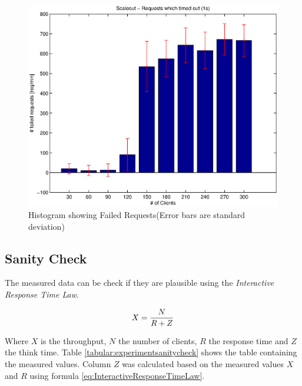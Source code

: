 \documentclass[a4paper]{article}
\begin{document}


\begin{figure}[H]
	\begin{center}
    \includegraphics[scale=0.6]{../plots-ms2-mg/experiment-err.eps}
  \end{center}
  \caption{Histogram showing Failed Requests\newline(Error bars are standard deviation)}
  \label{fig:experiment-error}
\end{figure}


\subsection{Sanity Check}

The measured data can be check if they are plausible using the \textit{Interactive Response Time Law}.

\begin{equation}
\label{eq:InteractiveResponseTimeLaw}
X = {{N} \over {R + Z}}
\end{equation}


Where $X$ is the throughput, $N$ the number of clients, $R$ the response time and $Z$ the think 	time. Table \ref{tabular:experimentsanitycheck} shows the table containing the measured values. Column $Z$ was calculated based on the measured values $X$ and $R$ using formula \ref{eq:InteractiveResponseTimeLaw}. 
\end{document}

